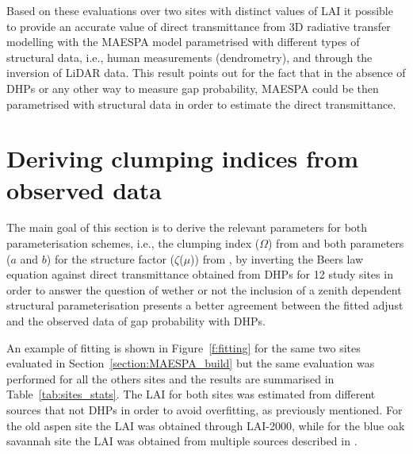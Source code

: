 \documentclass[a4paper,11pt]{report}
\begin{document}
Based on these evaluations over two sites with distinct values of LAI it possible to provide an accurate value of direct transmittance from 3D radiative transfer modelling with the MAESPA model parametrised with different types of structural data, i.e., human measurements (dendrometry), and through the inversion of LiDAR data. This result points out for the fact that in the absence of DHPs or any other way to measure gap probability, MAESPA could be then parametrised with structural data in order to estimate the direct transmittance.


\section{Deriving clumping indices from observed data}\label{section:statistical}

The main goal of this section is to derive the relevant parameters for both parameterisation schemes, i.e., the clumping index ($\Omega$) from \citet{Nilson1971} and both parameters ($a$ and $b$) for the structure factor ($\zeta$($\mu$)) from \citet{pinty2006}, by inverting the Beer\textquotesingle s law equation against direct transmittance obtained from DHPs for 12 study sites in order to answer the question of wether or not the inclusion of a zenith dependent structural parameterisation presents a better agreement between the fitted adjust and the observed data of gap probability with DHPs.

An example of fitting is shown in Figure~\ref{f:fitting} for the same two sites evaluated in Section~\ref{section:MAESPA_build} but the same evaluation was performed for all the others sites and the results are summarised in Table~\ref{tab:sites_stats}. The LAI for both sites was estimated from different sources that not DHPs in order to avoid overfitting, as previously mentioned. For the old aspen site the LAI was obtained through LAI-2000, while for the blue oak savannah site the LAI was obtained from multiple sources described in \citet{Ryu2010}.
\end{document}
